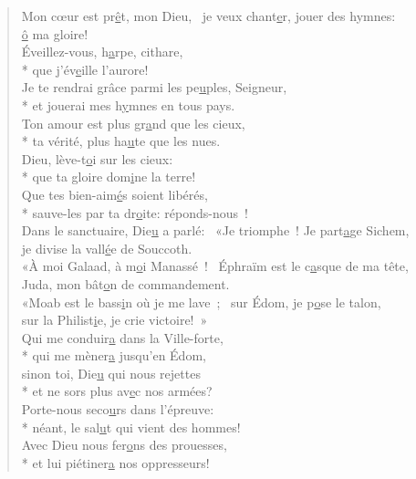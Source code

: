 
\begin{verse}
Mon cœur est pr\underline{ê}t, mon Dieu,~\psalmdagger
je veux chant\underline{e}r, jouer des hymnes: \\
\underline{ô} ma gloire! \\

Éveillez-vous, h\underline{a}rpe, cithare, \\*
que j’év\underline{e}ille l’aurore! \\

Je te rendrai grâce parmi les pe\underline{u}ples, Seigneur, \\*
et jouerai mes h\underline{y}mnes en tous pays. \\
Ton amour est plus gr\underline{a}nd que les cieux, \\*
ta vérité, plus ha\underline{u}te que les nues. \\

Dieu, lève-t\underline{o}i sur les cieux: \\*
que ta gloire dom\underline{i}ne la terre! \\
Que tes bien-aim\underline{é}s soient libérés, \\*
sauve-les par ta dr\underline{o}ite: réponds-nous ! \\

Dans le sanctuaire, Die\underline{u} a parlé:~\psalmdagger
«Je triomphe ! Je part\underline{a}ge Sichem, \\
je divise la vall\underline{é}e de Souccoth. \\

«À moi Galaad, à m\underline{o}i Manassé !~\psalmdagger
Éphraïm est le c\underline{a}sque de ma tête, \\
Juda, mon bât\underline{o}n de commandement. \\

«Moab est le bass\underline{i}n où je me lave ;~\psalmdagger
sur Édom, je p\underline{o}se le talon, \\
sur la Philist\underline{i}e, je crie victoire! » \\

Qui me conduir\underline{a} dans la Ville-forte, \\*
qui me mèner\underline{a} jusqu’en Édom, \\
sinon toi, Die\underline{u} qui nous rejettes \\*
et ne sors plus av\underline{e}c nos armées? \\

Porte-nous seco\underline{u}rs dans l’épreuve: \\*
néant, le sal\underline{u}t qui vient des hommes! \\
Avec Dieu nous fer\underline{o}ns des prouesses, \\*
et lui piétiner\underline{a} nos oppresseurs! \\
\end{verse}

